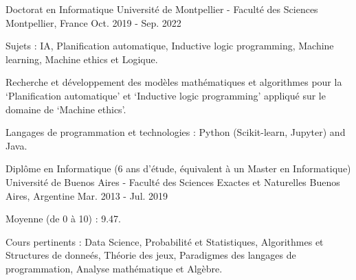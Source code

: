 

\begin{cventries}

  \cventry
    {Doctorat en Informatique}
    {Université de Montpellier - Faculté des Sciences}
    {Montpellier, France}
    {Oct. 2019 - Sep. 2022}
    {
      \begin{cvitems}
        \item Sujets : IA, Planification automatique, Inductive logic programming, Machine learning, Machine ethics et Logique.
        \item Recherche et développement des modèles mathématiques et algorithmes pour la `Planification automatique' et `Inductive logic programming' appliqué sur le domaine de `Machine ethics'.
        \item Langages de programmation et technologies : Python (Scikit-learn, Jupyter) and Java.
      \end{cvitems}
    }  

  \cventry
  {Diplôme en Informatique (6 ans d'étude, équivalent à un Master en Informatique)}
  {Université de Buenos Aires - Faculté des Sciences Exactes et Naturelles}
  {Buenos Aires, Argentine}
  {Mar. 2013 - Jul. 2019}
  {
    \begin{cvitems}
      \item Moyenne (de 0 à 10) : 9.47.
      \item Cours pertinents : Data Science, Probabilité et Statistiques, Algorithmes et Structures de donneés, Théorie des jeux, Paradigmes des langages de programmation, Analyse mathématique et Algèbre.
    \end{cvitems}
  }  

\end{cventries}
